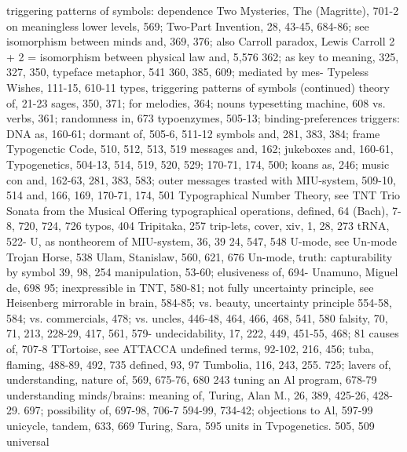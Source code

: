 triggering patterns of symbols: dependence     Two Mysteries, The (Magritte), 701-2
on meaningless lower levels, 569;              Two-Part Invention, 28, 43-45, 684-86; see
isomorphism between minds and, 369, 376;       also Carroll paradox, Lewis Carroll 2 + 2 =
isomorphism between physical law and,          5,576
362; as key to meaning, 325, 327, 350,         typeface metaphor, 541
360, 385, 609; mediated by mes-                Typeless Wishes, 111-15, 610-11 types,
triggering patterns of symbols (continued)     theory of, 21-23
sages, 350, 371; for melodies, 364; nouns      typesetting machine, 608
vs. verbs, 361; randomness in, 673             typoenzymes, 505-13; binding-preferences
triggers: DNA as, 160-61; dormant              of, 505-6, 511-12
symbols and, 281, 383, 384; frame              Typogenctic Code, 510, 512, 513, 519
messages and, 162; jukeboxes and, 160-61,      Typogenetics, 504-13, 514, 519, 520, 529;
170-71, 174, 500; koans as, 246; music         con
and, 162-63, 281, 383, 583; outer messages     trasted with MIU-system, 509-10, 514
and, 166, 169, 170-71, 174, 501                Typographical Number Theory, see TNT
Trio Sonata from the Musical Offering          typographical operations, defined, 64
(Bach), 7-8, 720, 724, 726                     typos, 404
Tripitaka, 257
trip-lets, cover, xiv, 1, 28, 273 tRNA, 522-   U, as nontheorem of MIU-system, 36, 39
24, 547, 548                                   U-mode, see Un-mode
Trojan Horse, 538                              Ulam, Stanislaw, 560, 621, 676 Un-mode,
truth:      capturability      by     symbol   39, 98, 254
manipulation, 53-60; elusiveness of, 694-      Unamuno, Miguel de, 698
95; inexpressible in TNT, 580-81; not fully    uncertainty principle, see Heisenberg
mirrorable in brain, 584-85; vs. beauty,       uncertainty principle
554-58, 584; vs. commercials, 478; vs.         uncles, 446-48, 464, 466, 468, 541, 580
falsity, 70, 71, 213, 228-29, 417, 561, 579-   undecidability, 17, 222, 449, 451-55, 468;
81                                             causes of, 707-8
TTortoise, see ATTACCA                         undefined terms, 92-102, 216, 456;
tuba, flaming, 488-89, 492, 735                defined, 93, 97
Tumbolia, 116, 243, 255. 725; lavers of,       understanding, nature of, 569, 675-76, 680
243 tuning an Al program, 678-79               understanding minds/brains: meaning of,
Turing, Alan M., 26, 389, 425-26, 428-29.      697; possibility of, 697-98, 706-7
594-99, 734-42; objections to Al, 597-99       unicycle, tandem, 633, 669
Turing, Sara, 595                              units in Tvpogenetics. 505, 509 universal

